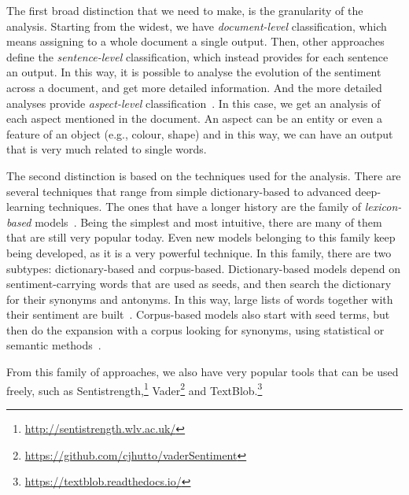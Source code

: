 
The first broad distinction that we need to make, is the granularity of the analysis.
Starting from the widest, we have \emph{document-level} classification, which means assigning to a whole document a single output.
Then, other approaches define the \emph{sentence-level} classification, which instead provides for each sentence an output. In this way, it is possible to analyse the evolution of the sentiment across a document, and get more detailed information.
And the more detailed analyses provide \emph{aspect-level} classification~\citep{zhang2022survey}. In this case, we get an analysis of each aspect mentioned in the document. An aspect can be an entity or even a feature of an object (e.g., colour, shape) and in this way, we can have an output that is very much related to single words.

The second distinction is based on the techniques used for the analysis. There are several techniques that range from simple dictionary-based to advanced deep-learning techniques.
The ones that have a longer history are the family of \emph{lexicon-based} models~\citep{taboada2011lexicon}. Being the simplest and most intuitive, there are many of them that are still very popular today. Even new models belonging to this family keep being developed, as it is a very powerful technique.
In this family, there are two subtypes: dictionary-based and corpus-based.
Dictionary-based models depend on sentiment-carrying words that are used as seeds, and then search the dictionary for their synonyms and antonyms. In this way, large lists of words together with their sentiment are built~\citep{okango2022dictionary,hardeniya2016dictionary}.
Corpus-based models also start with seed terms, but then do the expansion with a corpus looking for synonyms, using statistical or semantic methods~\citep{darwich2019corpus,rice2021corpus}.


From this family of approaches, we also have very popular tools that can be used freely, such as Sentistrength,\footnote{\url{http://sentistrength.wlv.ac.uk/}} Vader\footnote{\url{https://github.com/cjhutto/vaderSentiment}} and TextBlob.\footnote{\url{ https://textblob.readthedocs.io/}}


